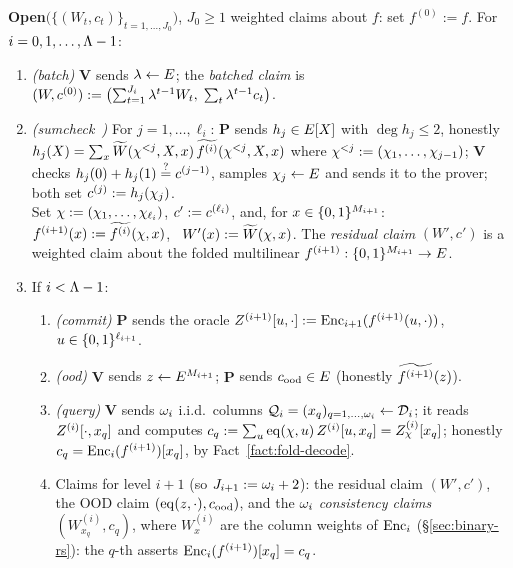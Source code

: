 \begin{protocol}
\smallskip
\textbf{Open}$\bigl(\{(W_t, c_t)\}_{t = 1, \dots, J_0}\bigr)$, $J_0 \ge 1$ weighted claims about $f$: set $f^{(0)} := f$. For $i = 0, 1, \dots, \Lambda - 1$:
\begin{enumerate}[itemsep=0.5pt,topsep=2pt]
\item \emph{(batch)} $\mathbf{V}$ sends $\lambda \leftarrow E$; the \emph{batched claim} is $(W, c^{(0)}) := \bigl(\sum_{t = 1}^{J_i} \lambda^{t-1} W_t,\; \sum_{t} \lambda^{t-1} c_t\bigr)$.
\item \emph{(sumcheck~\cite{LFKN92})} For $j = 1, \dots, \ell_i$: $\mathbf{P}$ sends $h_j \in E[X]$ with $\deg h_j \le 2$, honestly $h_j(X) = \sum_{x} \widetilde{W}(\chi^{<j}, X, x)\, \widetilde{f^{(i)}}(\chi^{<j}, X, x)$ where $\chi^{<j} := (\chi_1, \dots, \chi_{j-1})$; $\mathbf{V}$ checks $h_j(0) + h_j(1) \stackrel{?}{=} c^{(j-1)}$, samples $\chi_j \leftarrow E$ and sends it to the prover; both set $c^{(j)} := h_j(\chi_j)$.\\
Set $\chi := (\chi_1, \dots, \chi_{\ell_i})$, $c' := c^{(\ell_i)}$, and, for $x \in \{0,1\}^{M_{i+1}}$: \ $f^{(i+1)}(x) := \widetilde{f^{(i)}}(\chi, x)$, \ $W'(x) := \widetilde{W}(\chi, x)$. The \emph{residual claim} $(W', c')$ is a weighted claim about the folded multilinear $f^{(i+1)} : \{0,1\}^{M_{i+1}} \to E$.
\item If $i < \Lambda - 1$:
\begin{enumerate}[itemsep=0.5pt,topsep=1pt,label=(\alph*)]
\item \emph{(commit)} $\mathbf{P}$ sends the oracle $Z^{(i+1)}[u, \cdot] := \mathrm{Enc}_{i+1}(f^{(i+1)}(u, \cdot))$, $u \in \{0,1\}^{\ell_{i+1}}$.
\item \emph{(ood)} $\mathbf{V}$ sends $z \leftarrow E^{M_{i+1}}$; $\mathbf{P}$ sends $c_{\mathrm{ood}} \in E$ (honestly $\widetilde{f^{(i+1)}}(z)$).
\item \emph{(query)} $\mathbf{V}$ sends $\omega_i$ i.i.d.\ columns $\mathcal{Q}_i = (x_q)_{q = 1, \dots, \omega_i} \leftarrow \mathcal{D}_i$; it reads $Z^{(i)}[\cdot, x_q]$ and computes $c_q := \sum_{u} \operatorname{eq}(\chi, u)\, Z^{(i)}[u, x_q] = Z^{(i)}_\chi[x_q]$; honestly $c_q = \mathrm{Enc}_i(f^{(i+1)})[x_q]$, by Fact~\ref{fact:fold-decode}.
\item Claims for level $i+1$ (so $J_{i+1} := \omega_i + 2$): the residual claim $(W', c')$, the OOD claim $(\operatorname{eq}(z, \cdot), c_{\mathrm{ood}})$, and the $\omega_i$ \emph{consistency claims} $(W^{(i)}_{x_q}, c_q)$, where $W^{(i)}_x$ are the column weights of $\mathrm{Enc}_i$ (\S\ref{sec:binary-rs}): the $q$-th asserts $\mathrm{Enc}_i(f^{(i+1)})[x_q] = c_q$.
\end{enumerate}

\end{enumerate}
\end{protocol}
